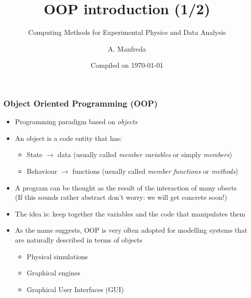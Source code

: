 \documentclass[9pt]{beamer}
\title{OOP introduction (1/2)}
\subtitle{Computing Methods for Experimental Physics and Data Analysis}
\date{Compiled on \today}
\author{A. Manfreda}
\institute[INFN]{INFN--Pisa}
\begin{document}
\titleframe


\begin{frame}
  \frametitle{Object Oriented Programming (OOP)}
  
  \begin{itemize}
    \small
    \item Programming paradigm based on \emph{objects}
    \bigskip
    \item An object is a code entity that has:
    \smallskip
    \begin{itemize}
      \item \alert{State} $\rightarrow$ data (usually called \emph{member variables} or simply \emph{members})
      \smallskip
      \item \alert{Behaviour} $\rightarrow$ functions (usually called \emph{member functions} or \emph{methods})
    \end{itemize}
    \medskip
    \item A program can be thought as the result of the interaction of many obects \\
          (If this sounds rather abstract don't worry: we will get concrete soon!)
    \bigskip
    \item The idea is: keep together the variables and the code that manipulates them
    \bigskip
    \item As the name suggests, OOP is very often adopted for modelling systems that are naturally
          described in terms of objects  
    \begin{itemize}
      \smallskip
      \item Physical simulations
      \smallskip
      \item Graphical engines
      \smallskip
      \item Graphical User Interfaces (GUI) 
    \end{itemize}

  \end{itemize}
\end{frame}
\end{document}
